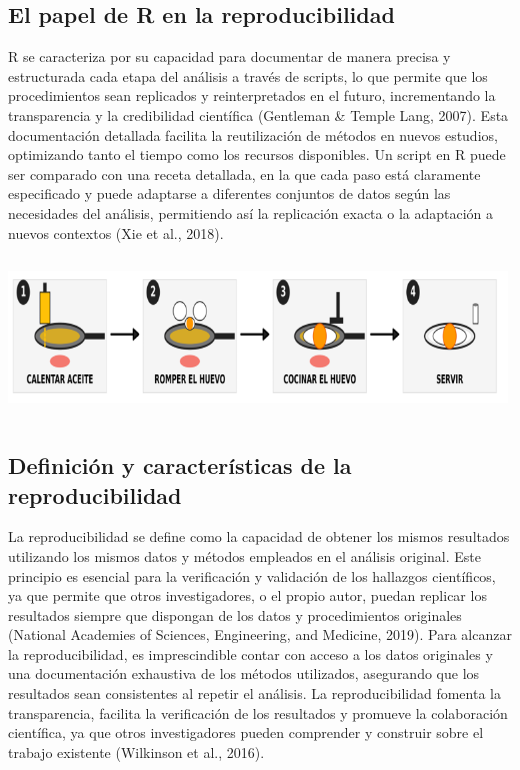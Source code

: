 \documentclass[
  spanish,
  a4paper,
  DIV=11,
  numbers=noendperiod,
  onepage,
  openany]{scrreprt}
\begin{document}
\subsection{El papel de R en la
reproducibilidad}\label{el-papel-de-r-en-la-reproducibilidad}

R se caracteriza por su capacidad para documentar de manera precisa y
estructurada cada etapa del análisis a través de scripts, lo que permite
que los procedimientos sean replicados y reinterpretados en el futuro,
incrementando la transparencia y la credibilidad científica (Gentleman
\& Temple Lang, 2007). Esta documentación detallada facilita la
reutilización de métodos en nuevos estudios, optimizando tanto el tiempo
como los recursos disponibles. Un script en R puede ser comparado con
una receta detallada, en la que cada paso está claramente especificado y
puede adaptarse a diferentes conjuntos de datos según las necesidades
del análisis, permitiendo así la replicación exacta o la adaptación a
nuevos contextos (Xie et al., 2018).

\begin{center}
\includegraphics[width=5.20833in,height=1.66667in]{Captura de pantalla 2025-04-03 170742.png}
\end{center}

\subsection{Definición y características de la
reproducibilidad}\label{definiciuxf3n-y-caracteruxedsticas-de-la-reproducibilidad}

La reproducibilidad se define como la capacidad de obtener los mismos
resultados utilizando los mismos datos y métodos empleados en el
análisis original. Este principio es esencial para la verificación y
validación de los hallazgos científicos, ya que permite que otros
investigadores, o el propio autor, puedan replicar los resultados
siempre que dispongan de los datos y procedimientos originales (National
Academies of Sciences, Engineering, and Medicine, 2019). Para alcanzar
la reproducibilidad, es imprescindible contar con acceso a los datos
originales y una documentación exhaustiva de los métodos utilizados,
asegurando que los resultados sean consistentes al repetir el análisis.
La reproducibilidad fomenta la transparencia, facilita la verificación
de los resultados y promueve la colaboración científica, ya que otros
investigadores pueden comprender y construir sobre el trabajo existente
(Wilkinson et al., 2016).
\end{document}

